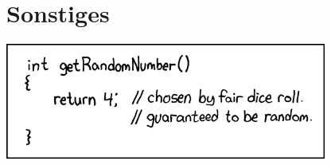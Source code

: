 \documentclass[]{papertex}
\begin{document}
	\section{Sonstiges}
		\label{sonstiges}
		\begin{center}
		\includegraphics[totalheight=3cm]{bilder/XKCD/random_number}
		\end{center}
		\begin{multicols}{2}
		
		
		\end{multicols}
		\newpage
		
		\newpage
		
\end{document}
